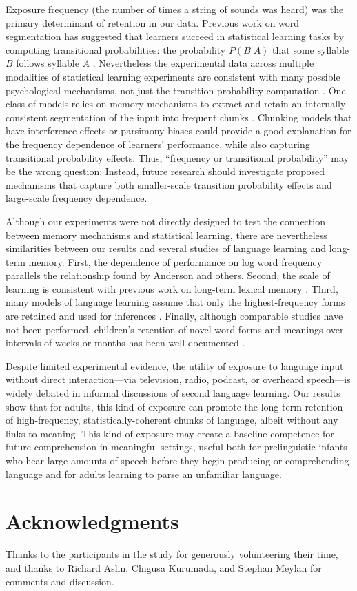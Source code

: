\documentclass[10pt]{article}
\begin{document}
Exposure frequency (the number of times a string of sounds was heard) was the primary determinant of retention in our data. Previous work on word segmentation has suggested that learners succeed in statistical learning tasks by computing transitional probabilities: the probability $P(B|A)$ that some syllable $B$ follows syllable $A$ \cite{saffran1996a, saffran1996b}. Nevertheless the experimental data across multiple modalities of statistical learning experiments are consistent with many possible psychological mechanisms, not just the transition probability computation \cite{kurumada2011,frank2010,orban2008}. One class of models relies on memory mechanisms to extract and retain an internally-consistent segmentation of the input into frequent chunks \cite{perruchet1998,goldwater2009,french2011}. Chunking models that have interference effects or parsimony biases could provide a good explanation for the frequency dependence of learners' performance, while also capturing transitional probability effects. Thus, ``frequency or transitional probability'' may be the wrong question: Instead, future research should investigate proposed mechanisms that capture both smaller-scale transition probability effects and large-scale frequency dependence.  

Although our experiments were not directly designed to test the connection between memory mechanisms and statistical learning, there are nevertheless similarities between our results and several studies of language learning and long-term memory. First, the dependence of performance on log word frequency parallels the relationship found by Anderson \cite{anderson1990} and others. Second, the scale of learning is consistent with previous work on long-term lexical memory \cite{bahrick1993}. Third, many models of language learning assume that only the highest-frequency forms are retained and used for inferences \cite{swingley2005,mintz1995}. Finally, although comparable studies have not been performed, children's retention of novel word forms and meanings over intervals of weeks or months has been well-documented \cite{markson1997,jusczyk1997}.

Despite limited experimental evidence, the utility of exposure to language input without direct interaction---via television, radio, podcast, or overheard speech---is widely debated in informal discussions of second language learning. Our results show that for adults, this kind of exposure can promote the long-term retention of high-frequency, statistically-coherent chunks of language, albeit without any links to meaning. This kind of exposure may create a baseline competence for future comprehension in meaningful settings, useful both for prelinguistic infants who hear large amounts of speech before they begin producing or comprehending language and for adults learning to parse an unfamiliar language.

\section*{Acknowledgments}

Thanks to the participants in the study for generously volunteering their time, and thanks to Richard Aslin, Chigusa Kurumada, and Stephan Meylan for comments and discussion. 


\end{document}
